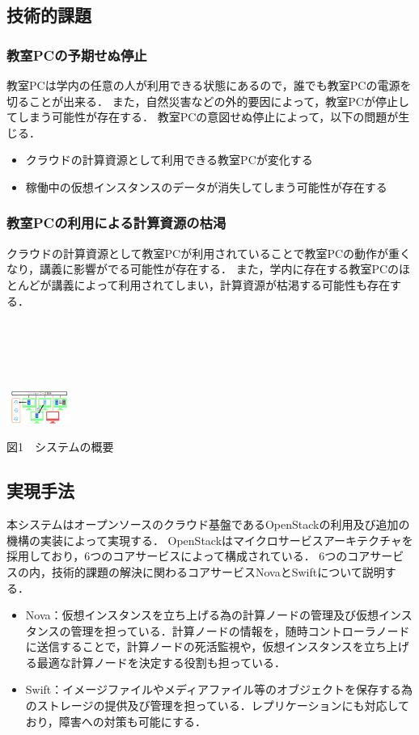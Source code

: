 \documentclass[10pt,a4paper]{jsarticle}
\begin{document}
\subsection{技術的課題}
\subsubsection{教室PCの予期せぬ停止}
教室PCは学内の任意の人が利用できる状態にあるので，誰でも教室PCの電源を切ることが出来る．
また，自然災害などの外的要因によって，教室PCが停止してしまう可能性が存在する．
教室PCの意図せぬ停止によって，以下の問題が生じる．
\begin{itemize}
	\item クラウドの計算資源として利用できる教室PCが変化する
	\item 稼働中の仮想インスタンスのデータが消失してしまう可能性が存在する
\end{itemize}
\subsubsection{教室PCの利用による計算資源の枯渇}
クラウドの計算資源として教室PCが利用されていることで教室PCの動作が重くなり，講義に影響がでる可能性が存在する．
また，学内に存在する教室PCのほとんどが講義によって利用されてしまい，計算資源が枯渇する可能性も存在する．
\\
\\
\\
\\
\\
\\
\includegraphics[width=2.1cm, bb=0 0 300 400]{graph1.pdf}
\begin{center}図1　システムの概要\end{center}

\subsection{実現手法}
本システムはオープンソースのクラウド基盤であるOpenStack\cite{openstack}の利用及び追加の機構の実装によって実現する．
OpenStackはマイクロサービスアーキテクチャを採用しており，6つのコアサービスによって構成されている．
6つのコアサービスの内，技術的課題の解決に関わるコアサービスNovaとSwiftについて説明する．
\begin{itemize}
	\item Nova：仮想インスタンスを立ち上げる為の計算ノードの管理及び仮想インスタンスの管理を担っている．計算ノードの情報を，随時コントローラノードに送信することで，計算ノードの死活監視や，仮想インスタンスを立ち上げる最適な計算ノードを決定する役割も担っている．
	\item Swift：イメージファイルやメディアファイル等のオブジェクトを保存する為のストレージの提供及び管理を担っている．レプリケーションにも対応しており，障害への対策も可能にする．
\end{itemize}
\end{document}
